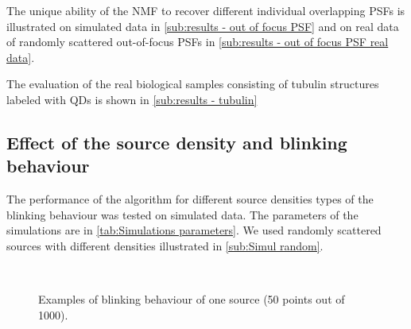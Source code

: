 The unique ability of the NMF to recover different individual overlapping PSFs is illustrated on simulated data in \autoref{sub:results - out of focus PSF} and on real data of randomly scattered out-of-focus PSFs in \autoref{sub:results - out of focus PSF real data}.

The evaluation of the real biological samples consisting of tubulin structures labeled with QDs is shown in \autoref{sub:results - tubulin}


\subsection{Effect of the source density and blinking behaviour \label{sub:results - blinking behaviour}}
The performance of the algorithm for different source densities types of the blinking behaviour was tested on simulated data. The parameters of the simulations are in \autoref{tab:Simulations parameters}. We used randomly scattered sources with different densities illustrated in \autoref{sub:Simul random}.

\begin{figure}[!h]
	\centering
	\newcommand{\sizef}{.35}
	\\
	\subfloat[telegraph oversampled ($\gamma=5$)]{
	\texttt{[image: \\qd S455/images/blinkmatS565]}} %
	\caption{Examples of blinking behaviour of one source (50 points out of 1000).}
	\label{fig:blinking}
\end{figure}

